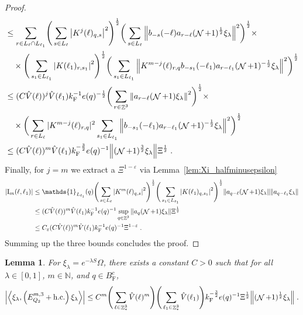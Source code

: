 \documentclass[12pt,a4paper]{article}
\numberwithin{equation}{section}
\newcommand{\NNN}{\mathbb{N}}
\newcommand{\1}{\mathbb{I}}
\newcommand{\F}{\mathrm{F}}
\newcommand{\I}{\mathrm{I}}
\DeclareMathOperator{\Z}{\mathbb{Z}}
\DeclareMathOperator{\NN}{\mathcal{N}}
\newcommand{\half}{\frac{1}{2}}
\newcommand{\eva}[1]{\left\langle #1 \right\rangle}
\theoremstyle{plain}
\newtheorem{lemma}[theorem]{Lemma}
\theoremstyle{definition}
\theoremstyle{remark}
\theoremstyle{plain}
\theoremstyle{definition}
\theoremstyle{remark}
\begin{document}
\begin{proof}
\begin{align}
	&\leq \sum_{r\in L_{\ell} \cap L_{\ell_1}}\! \Bigg( \sum_{s \in L_\ell} \abs{K^{j}(\ell)_{q,s}}^2\Bigg)^\half \bigg( \sum_{s \in L_\ell}\norm{b_{-s}(-\ell) a_{r-\ell} (\NN+1)^{\half}\xi_\lambda}^2\bigg)^\half \times\nonumber\\
		&\quad \times \Bigg( \sum_{s_1 \in L_{\ell_1}}\abs{K(\ell_1)_{r,s_1}}^2\Bigg)^\half \bigg(\sum_{s_1 \in L_{\ell_1}}\norm{ K^{m-j}(\ell)_{r,q} b_{-s_1}(-\ell_1)  a_{r-\ell_1} (\NN+1)^{-\half}\xi_\lambda }^2\bigg)^\half
	\nonumber\\
	&\leq (C \hat{V}(\ell))^j \hat{V}(\ell_1) k_{\F}^{-1} e(q)^{-\half}
	\bigg( \sum_{r\in \Z^3} \norm{ a_{r-\ell} (\NN+1) \xi_\lambda}^2\bigg)^\half \times \nonumber\\
		&\quad \times 
	\bigg(\sum_{r\in L_{\ell}} |K^{m-j}(\ell)_{r,q} |^2
		\sum_{s_1 \in L_{\ell_1}}\norm{ b_{-s_1}(-\ell_1) a_{r-\ell_1} (\NN+1)^{-\half}\xi_\lambda }^2\bigg)^\half
	\nonumber\\
	&\leq (C \hat{V}(\ell))^m
		\hat{V}(\ell_1)
		k_{\F}^{-\frac 32} e(q)^{-1}
		\norm{ (\NN+1)^{\frac 32}\xi_\lambda } \Xi^{\half} \;. \label{eq:estEQ2112}
\end{align}
Finally, for $ j = m $ we extract a $ \Xi^{1-\varepsilon} $ via Lemma~\ref{lem:Xi_halfminusepsilon}
\begin{align}
	|\I_m(\ell, \ell_1)|
	&\leq \mathds{1}_{L_{\ell_1}}(q) \Bigg(\sum_{s \in L_{\ell}} \abs{K^m(\ell)_{q,s}}^2\Bigg)^\half
		\Bigg(\sum_{s_1 \in L_{\ell_1}} \abs{K(\ell_1)_{q,s_1}}^2\Bigg)^\half
		\norm{ a_{q-\ell} (\NN+1) \xi_\lambda}
		\norm{ a_{q-\ell_1} \xi_\lambda }\nonumber\\
	&\leq (C \hat{V}(\ell))^m \hat{V}(\ell_1) k_{\F}^{-1} e(q)^{-1}
		\sup_{q \in \Z^3} \norm{ a_q (\NN+1) \xi_\lambda }\Xi^{\half} \nonumber\\
	&\leq C_\varepsilon (C \hat{V}(\ell))^m
		\hat{V}(\ell_1)
		k_{\F}^{-1} e(q)^{-1} \Xi^{1-\varepsilon} \;. \label{eq:estEQ2113}
\end{align}
Summing up the three bounds concludes the proof.
\end{proof}


\begin{lemma} \label{lem:EQ215}
For $\xi_\lambda = e^{-\lambda S} \Omega$, there exists a constant $ C > 0 $ such that for all $ \lambda \in [0,1] $, $ m \in \NNN $, and $ q \in B_{\F}^c $,
\begin{align}
	\abs{\eva{\xi_\lambda,\left(E^{m,3}_{Q_2}+\mathrm{h.c.}\right) \xi_\lambda }}
	\leq C^m \Bigg(\sum_{\ell\in \Z^3_*} \hat{V}(\ell)^m \Bigg)
		\Bigg(\sum_{\ell_1\in \Z^3_*} \hat{V}(\ell_1) \Bigg)
		k_{\F}^{-\frac{3}{2}} e(q)^{-1} \Xi^{\half}
		\norm{(\NN+1)^\half \xi_\lambda } \;. \label{eq:estEQ215}
\end{align}
\end{lemma}
\end{document}
